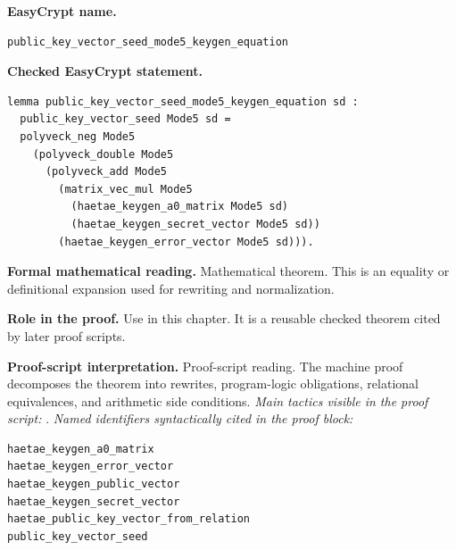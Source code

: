 \begin{formaltheorem}
\noindent\textbf{EasyCrypt name.}
\begin{lstlisting}[language=EasyCrypt,basicstyle=\ttfamily\scriptsize]
public_key_vector_seed_mode5_keygen_equation
\end{lstlisting}
\noindent\textbf{Checked EasyCrypt statement.}
\begin{lstlisting}[language=EasyCrypt,basicstyle=\ttfamily\scriptsize]
lemma public_key_vector_seed_mode5_keygen_equation sd :
  public_key_vector_seed Mode5 sd =
  polyveck_neg Mode5
    (polyveck_double Mode5
      (polyveck_add Mode5
        (matrix_vec_mul Mode5
          (haetae_keygen_a0_matrix Mode5 sd)
          (haetae_keygen_secret_vector Mode5 sd))
        (haetae_keygen_error_vector Mode5 sd))).
\end{lstlisting}
\noindent\textbf{Formal mathematical reading.}
Mathematical theorem. This is an equality or definitional expansion used for rewriting and normalization.

\noindent\textbf{Role in the proof.}
Use in this chapter. It is a reusable checked theorem cited by later proof scripts.

\noindent\textbf{Proof-script interpretation.}
Proof-script reading. The machine proof decomposes the theorem into rewrites, program-logic obligations, relational equivalences, and arithmetic side conditions.
\emph{Main tactics visible in the proof script:} .
\emph{Named identifiers syntactically cited in the proof block:}
\begin{lstlisting}[language=EasyCrypt,basicstyle=\ttfamily\scriptsize]
haetae_keygen_a0_matrix
haetae_keygen_error_vector
haetae_keygen_public_vector
haetae_keygen_secret_vector
haetae_public_key_vector_from_relation
public_key_vector_seed
\end{lstlisting}

\end{formaltheorem}

